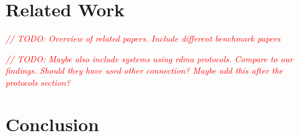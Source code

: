 \documentclass{article}
\newcommand{\todo}[1]{\textit{\textcolor{red}{// TODO: #1} }}
\theoremstyle{plain}
\theoremstyle{definition}
\theoremstyle{remark}
\begin{document}
\iffalse
\fi
\newcommand{\seqnode}[3][]{ 
  \node[#1] (#2) {#3};
  \node[below of=#2, node distance=5cm] (#2_g) {};
  \draw (#2) -- (#2_g);
}
\newcommand{\hseqnode}[3][]{ 
  \node[#1] (#2) {#3};
  \node[below of=#2, node distance=5cm] (#2_g) {};
}
\newcommand{\msg}[5][above]{
  \draw[->] ($(#2)!#4!(#2_g)$) -- node[#1,scale=0.75,midway]{#5} ($(#3)!#4+0.04!(#3_g)$);
}
\newcommand{\fetch}[4]{
  \draw[-] ($(#1)!#3-0.04!(#1_g)$) -- node[above,scale=0.75,midway]{#4} ($(#2)!#3!(#2_g)$);
  \draw[->] ($(#2)!#3!(#2_g)$) -- node[above,scale=0.75,midway]{} ($(#1)!#3+0.04!(#1_g)$);
}

\newcommand{\queue}[2][]{ 
  \draw (#2) -- ++(2cm,0) -- ++(0,-1cm) -- ++(-2cm,0);
  \foreach \i in {1,...,4} \draw (#2)++(2cm-\i*3mm,0) -- +(0,-1cm);
  \node[align=center, , xshift = 1cm, yshift = .15cm] at (#2) {#1};
}

\newcommand{\rqueue}[2][]{ 
  \draw (#2) -- ++(2cm,0);
  \draw (#2) -- ++(0,-1cm) -- ++(2cm,0);
  \foreach \i in {1,...,4} \draw (#2)++(\i*3mm,0) -- +(0,-1cm);
  \node[align=center, , xshift = 1cm, yshift = .15cm] at (#2) {#1};
}


\tableofcontents
\pagebreak


\pagebreak



\pagebreak
\section{Related Work}

\todo{Overview of related papers. Include different benchmark papers}

\todo{Maybe also include systems using rdma protocols. Compare to our findings. Should they have used other connection? 
Maybe add this after the protocols section?}

\pagebreak


\pagebreak


\pagebreak


\pagebreak


\pagebreak


\pagebreak


\pagebreak


\pagebreak


\pagebreak
\section{Conclusion}



\pagebreak


{}
\end{document}

